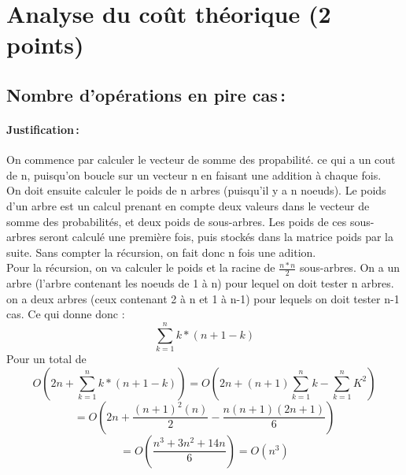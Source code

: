 \documentclass[a4paper, 10pt, french]{article}
\begin{document}
\section{Analyse du coût théorique (2 points)}

  \subsection{Nombre  d'opérations en pire cas\,: }
    \paragraph{Justification\,: }

	On commence par calculer le vecteur de somme des propabilité. ce qui a un cout de n, puisqu'on boucle sur un vecteur n en faisant une addition à chaque fois.\\	
	On doit ensuite calculer le poids de n arbres (puisqu'il y a n noeuds). Le poids d'un arbre est un calcul prenant en compte deux valeurs dans le vecteur de somme des probabilités, et deux poids de sous-arbres. Les poids de ces sous-arbres seront calculé une première fois, puis stockés dans la matrice poids par la suite. Sans compter la récursion, on fait donc n fois une adition.\\
	Pour la récursion, on va calculer le poids et la racine de $\frac{n*n}{2}$ sous-arbres. On a un arbre (l'arbre contenant les noeuds de 1 à n) pour lequel on doit tester n arbres. on a deux arbres (ceux contenant 2 à n et 1 à n-1) pour lequels on doit tester n-1 cas. Ce qui donne donc :
$$\sum_{k = 1}^{n} k*(n+1-k)$$
Pour un total de 
$$ O(2n + \sum_{k = 1}^{n} k*(n+1-k)) = 
O(2n + (n+1)\sum_{k = 1}^{n} k - \sum_{k = 1}^{n} K^2) $$ $$ = 
O(2n + \frac{(n+1)^2(n)}{2} - \frac{n(n+1)(2n+1)}{6}) $$ $$ =
O(\frac{n^3 + 3n^2 + 14n}{6}) = O(n^3)$$ 
 
\end{document}
